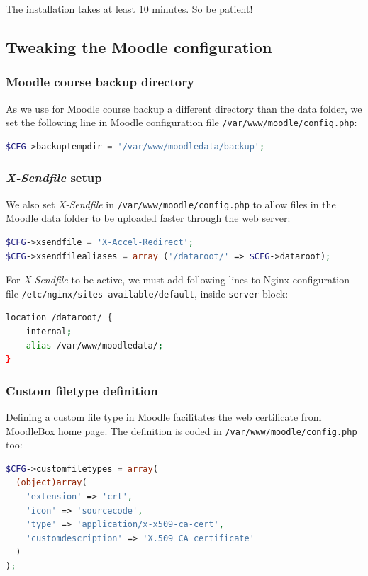 \documentclass[12pt]{article}
\begin{document}
The installation takes at least 10 minutes.
So be patient!

\subsection{Tweaking the Moodle configuration}

\subsubsection{Moodle course backup directory}

As we use for Moodle course backup a different directory than the data folder, we set the following line in Moodle configuration file \lstinline{/var/www/moodle/config.php}:
\begin{lstlisting}[language=php]
$CFG->backuptempdir = '/var/www/moodledata/backup';
\end{lstlisting}

\subsubsection{\emph{X-Sendfile} setup}

We also set \emph{X-Sendfile} in \lstinline{/var/www/moodle/config.php} to allow files in the Moodle data folder to be uploaded faster through the web server:
\begin{lstlisting}[language=php]
$CFG->xsendfile = 'X-Accel-Redirect';
$CFG->xsendfilealiases = array ('/dataroot/' => $CFG->dataroot);
\end{lstlisting}
For \emph{X-Sendfile} to be active, we must add following lines to Nginx configuration file \lstinline{/etc/nginx/sites-available/default}, inside \lstinline{server} block:
\begin{lstlisting}[language=bash]
location /dataroot/ {
    internal;
    alias /var/www/moodledata/;
}
\end{lstlisting}

\subsubsection{Custom filetype definition}

Defining a custom file type in Moodle facilitates the web certificate from MoodleBox home page. The definition is coded in \lstinline{/var/www/moodle/config.php} too:
\begin{lstlisting}[language=php]
$CFG->customfiletypes = array(
  (object)array(
    'extension' => 'crt',
    'icon' => 'sourcecode',
    'type' => 'application/x-x509-ca-cert',
    'customdescription' => 'X.509 CA certificate'
  )
);
\end{lstlisting}
\end{document}
